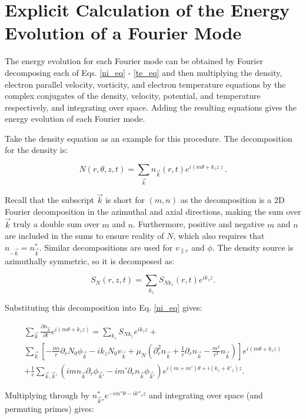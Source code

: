 \documentclass[showpacs,preprintnumbers,amsmath,amssymb,superscriptaddress,aip]{revtex4-1}
\def\beq{\begin{equation}}
\def\eeq{\end{equation}}
\def\beqar{\begin{eqnarray}}
\def\eeqar{\end{eqnarray}}
\newcommand{\pdiff}[2]{\frac{\partial#1}{\partial#2}}
\newcommand{\pdr}{\partial_r}
\newcommand{\pdrr}{\partial^2_r}
\newcommand{\vpe}{v_{\parallel e}}
\begin{document}
\appendix

\section{Explicit Calculation of the Energy Evolution of a Fourier Mode}

The energy evolution for each Fourier mode can be obtained by Fourier decomposing each of Eqs. \ref{ni_eq} - \ref{te_eq}
and then multiplying the density, electron parallel velocity, vorticity, and electron temperature equations by the complex conjugates of the 
density, velocity, potential, and temperature respectively, and integrating over space.
Adding the resulting equations gives the energy evolution of each Fourier mode.

Take the density equation as an example for this procedure. The decomposition for the density is:

\beq
\label{density_decomp}
N(r,\theta,z,t) = \sum_{\vec{k}} n_{\vec{k}}(r,t) e^{i(m \theta + k_z z)}.
\eeq

Recall that the subscript $\vec{k}$ is short for $(m,n)$ as the decomposition is a 2D Fourier decomposition in the azimuthal and axial directions, making the sum over $\vec{k}$ truly
a double sum over $m$ and $n$. Furthermore, positive and negative
$m$ and $n$ are included in the sums to ensure reality of $N$, which also requires that $n_{-\vec{k}} = n_{\vec{k}}^*$.
Similar decompositions are used for $\vpe$ and $\phi$. The density source is azimuthally symmetric, so it is decomposed as:

\beq
\label{source_decomp}
S_N(r,z,t) = \sum_{k_z} S_{N k_z}(r,t) e^{i k_z z}.
\eeq

Substituting this decomposition into Eq. \ref{ni_eq} gives:

\beqar
\label{density_eq_fourier}
\sum_{\vec{k}} \pdiff{n_{\vec{k}}}{t} e^{i(m \theta + k_z z)} = \sum_{k_z} S_{N k_z} e^{i k_z z} + \nonumber \\
\sum_{\vec{k}} \left[ -\frac{i m}{r} \pdr N_0 \phi_{\vec{k}} - i k_z N_0 v_{\vec{k}} + \mu_N(\pdrr n_{\vec{k}} + \frac{1}{r} \pdr n_{\vec{k}} - \frac{m^2}{r^2} n_{\vec{k}}) \right] e^{i(m \theta + k_z z)} \nonumber \\
+ \frac{1}{r} \sum_{\vec{k},\vec{k}'} (i m n_{\vec{k}} \pdr \phi_{\vec{k}'} - i m' \pdr n_{\vec{k}} \phi_{\vec{k}'}) e^{i (m + m') \theta + i (k_z + k'_z) z}.
\eeqar

Multiplying through by $n_{\vec{k}''}^* e^{- i m'' \theta - i k''_z z}$ and integrating over space (and permuting primes) gives:
\end{document}
